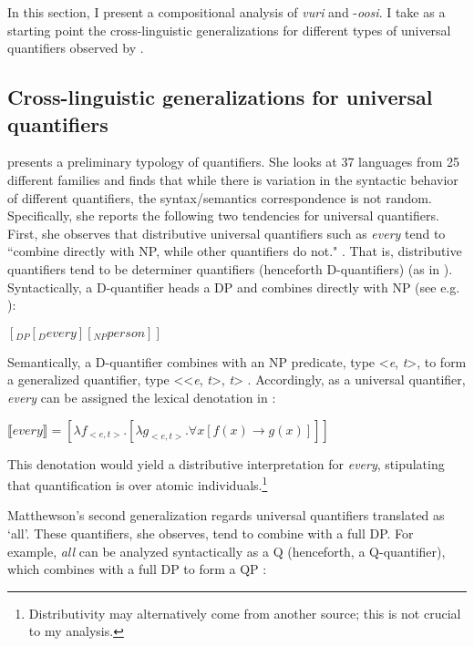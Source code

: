 \documentclass[output=paper]{langsci/langscibook}
\begin{document}
In this section, I present a compositional analysis of \textit{vuri} and -\textit{oosi}. I take as a starting point the cross-linguistic generalizations for different types of universal quantifiers observed by \citet{Matthewson2013}. 

\subsection{Cross-linguistic generalizations for universal quantifiers}

\citet{Matthewson2013} presents a preliminary typology of quantifiers. She looks at 37 languages from 25 different families and finds that while there is variation in the syntactic behavior of different quantifiers, the syntax/semantics correspondence is not random. Specifically, she reports the following two tendencies for universal quantifiers. First, she observes that distributive universal quantifiers such as  \textit{every} tend to ``combine directly with NP, while other quantifiers do not." \citep[36]{Matthewson2013}. That is, distributive quantifiers tend to be determiner quantifiers (henceforth D-quantifiers) (as in \citealt{BarwiseCooper1981}). Syntactically, a D-quantifier heads a DP and combines directly with NP (see e.g. \citealt[146]{HeimKratzer1998}): 

\ea\label{ex:landman:}
$[_{DP} [_{D} every] [_{NP} person]]$
\z

Semantically, a D-quantifier combines with an NP predicate, type <\textit{e}, \textit{t}>, to form a generalized quantifier, type <<\textit{e}, \textit{t}>, \textit{t}> \citep{Montague1973,BarwiseCooper1981}. Accordingly, as a universal quantifier, \textit{every} can be assigned the lexical denotation in :
 
\ea\label{ex:landman:15}
$⟦every⟧ = [{\lambda}f_{<e,t>} . [{\lambda}g_{<e,t>}. {\forall}x [f(x) \to g(x)]]]$
\z

This denotation would yield a distributive interpretation for \textit{every}, stipulating that quantification is over atomic individuals.\footnote{ Distributivity may alternatively come from another source; this is not crucial to my analysis.}

Matthewson's second generalization regards universal quantifiers translated as ‘all’. These quantifiers, she observes, tend to combine with a full DP. For example,  \textit{all} can be analyzed syntactically as a Q (henceforth, a Q-quantifier), which combines with a full DP to form a QP \citep{Matthewson2001}:  
\end{document}
